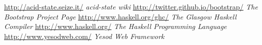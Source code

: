 \begin{thebibliography}{}
    \url{http://acid-state.seize.it/}
    \emph{acid-state wiki}
    \url{http://twitter.github.io/bootstrap/}
    \emph{The Bootstrap Project Page}
    \url{http://www.haskell.org/ghc/}
    \emph{The Glasgow Haskell Compiler}
    \url{http://www.haskell.org/}
    \emph{The Haskell Programming Language}
    \url{http://www.yesodweb.com/}
    \emph{Yesod Web Framework}
\end{thebibliography}